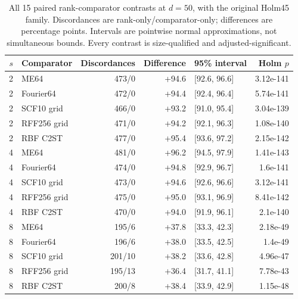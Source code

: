 \begin{table}[t]\centering\scriptsize
\caption{All 15 paired rank-comparator contrasts at $d=50$, with the original Holm45 family. Discordances are rank-only/comparator-only; differences are percentage points. Intervals are pointwise normal approximations, not simultaneous bounds. Every contrast is size-qualified and adjusted-significant.}
\label{tab:axis-paired-d50}
{\setlength{\tabcolsep}{8pt}\renewcommand{\arraystretch}{1.2}
\begin{tabular}{rlrrlr}
\toprule
$s$ & Comparator & Discordances & Difference & 95\% interval & Holm $p$\\
\midrule
2 & ME64 & 473/0 & +94.6 & [92.6, 96.6] & 3.12e-141\\
2 & Fourier64 & 472/0 & +94.4 & [92.4, 96.4] & 5.74e-141\\
2 & SCF10 grid & 466/0 & +93.2 & [91.0, 95.4] & 3.04e-139\\
2 & RFF256 grid & 471/0 & +94.2 & [92.1, 96.3] & 1.08e-140\\
2 & RBF C2ST & 477/0 & +95.4 & [93.6, 97.2] & 2.15e-142\\
4 & ME64 & 481/0 & +96.2 & [94.5, 97.9] & 1.41e-143\\
4 & Fourier64 & 474/0 & +94.8 & [92.9, 96.7] & 1.6e-141\\
4 & SCF10 grid & 473/0 & +94.6 & [92.6, 96.6] & 3.12e-141\\
4 & RFF256 grid & 475/0 & +95.0 & [93.1, 96.9] & 8.41e-142\\
4 & RBF C2ST & 470/0 & +94.0 & [91.9, 96.1] & 2.1e-140\\
8 & ME64 & 195/6 & +37.8 & [33.3, 42.3] & 2.18e-49\\
8 & Fourier64 & 196/6 & +38.0 & [33.5, 42.5] & 1.4e-49\\
8 & SCF10 grid & 201/10 & +38.2 & [33.6, 42.8] & 4.96e-47\\
8 & RFF256 grid & 195/13 & +36.4 & [31.7, 41.1] & 7.78e-43\\
8 & RBF C2ST & 200/8 & +38.4 & [33.9, 42.9] & 1.15e-48\\
\bottomrule
\end{tabular}}
\end{table}

